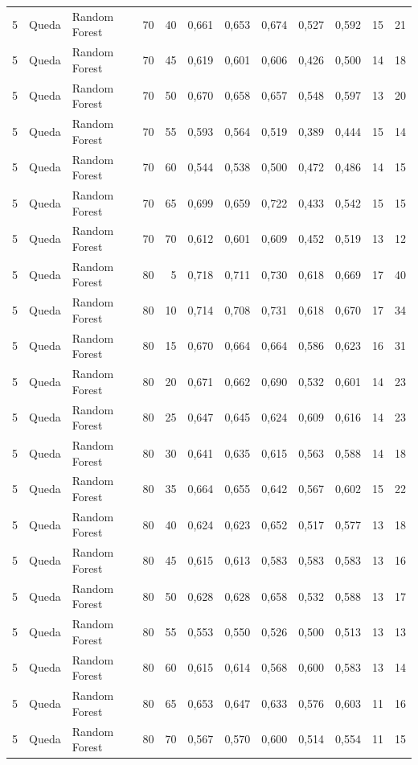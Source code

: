 \begin{longtable}{@{}rllrrrrrrrrr@{}}
5 & Queda & Random Forest & 70 & 40 & 0,661 & 0,653 & 0,674 & 0,527 & 0,592 & 15 & 21 \\
5 & Queda & Random Forest & 70 & 45 & 0,619 & 0,601 & 0,606 & 0,426 & 0,500 & 14 & 18 \\
5 & Queda & Random Forest & 70 & 50 & 0,670 & 0,658 & 0,657 & 0,548 & 0,597 & 13 & 20 \\
5 & Queda & Random Forest & 70 & 55 & 0,593 & 0,564 & 0,519 & 0,389 & 0,444 & 15 & 14 \\
5 & Queda & Random Forest & 70 & 60 & 0,544 & 0,538 & 0,500 & 0,472 & 0,486 & 14 & 15 \\
5 & Queda & Random Forest & 70 & 65 & 0,699 & 0,659 & 0,722 & 0,433 & 0,542 & 15 & 15 \\
5 & Queda & Random Forest & 70 & 70 & 0,612 & 0,601 & 0,609 & 0,452 & 0,519 & 13 & 12 \\
5 & Queda & Random Forest & 80 & 5 & 0,718 & 0,711 & 0,730 & 0,618 & 0,669 & 17 & 40 \\
5 & Queda & Random Forest & 80 & 10 & 0,714 & 0,708 & 0,731 & 0,618 & 0,670 & 17 & 34 \\
5 & Queda & Random Forest & 80 & 15 & 0,670 & 0,664 & 0,664 & 0,586 & 0,623 & 16 & 31 \\
5 & Queda & Random Forest & 80 & 20 & 0,671 & 0,662 & 0,690 & 0,532 & 0,601 & 14 & 23 \\
5 & Queda & Random Forest & 80 & 25 & 0,647 & 0,645 & 0,624 & 0,609 & 0,616 & 14 & 23 \\
5 & Queda & Random Forest & 80 & 30 & 0,641 & 0,635 & 0,615 & 0,563 & 0,588 & 14 & 18 \\
5 & Queda & Random Forest & 80 & 35 & 0,664 & 0,655 & 0,642 & 0,567 & 0,602 & 15 & 22 \\
5 & Queda & Random Forest & 80 & 40 & 0,624 & 0,623 & 0,652 & 0,517 & 0,577 & 13 & 18 \\
5 & Queda & Random Forest & 80 & 45 & 0,615 & 0,613 & 0,583 & 0,583 & 0,583 & 13 & 16 \\
5 & Queda & Random Forest & 80 & 50 & 0,628 & 0,628 & 0,658 & 0,532 & 0,588 & 13 & 17 \\
5 & Queda & Random Forest & 80 & 55 & 0,553 & 0,550 & 0,526 & 0,500 & 0,513 & 13 & 13 \\
5 & Queda & Random Forest & 80 & 60 & 0,615 & 0,614 & 0,568 & 0,600 & 0,583 & 13 & 14 \\
5 & Queda & Random Forest & 80 & 65 & 0,653 & 0,647 & 0,633 & 0,576 & 0,603 & 11 & 16 \\
5 & Queda & Random Forest & 80 & 70 & 0,567 & 0,570 & 0,600 & 0,514 & 0,554 & 11 & 15 \\

\end{longtable}
